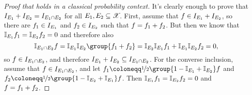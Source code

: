 \documentclass[preprint]{isipta2025}
\begin{document}
\begin{proof}[Proof that  holds in a classical probability context]
It's clearly enough to prove that \(\indifset[{\event[1]}]+\indifset[{\event[2]}]=\indifset[{\event[1]\cap\event[2]}]\) for all \(\event[1],\event[2]\subseteq\states\).
First, assume that \(\gbl\in\indifset[{\event[1]}]+\indifset[{\event[2]}]\), so there are \(\gbl_1\in\indifset[{\event[1]}]\) and \(\gbl_2\in\indifset[{\event[2]}]\) such that \(\gbl=\gbl_1+\gbl_2\).
But then we know that \(\indevent[1]\gbl_1=\indevent[2]\gbl_2=0\) and therefore also
\begin{equation*}
\indof{\event[1]\cap\event[2]}\gbl
=\indevent[1]\indevent[2]\group{\gbl_1+\gbl_2}
=\indevent[2]\indevent[1]\gbl_1+\indevent[1]\indevent[2]\gbl_2
=0,
\end{equation*}
so \(f\in\indifset[{\event[1]\cap\event[2]}]\), and therefore \(\indifset[{\event[1]}]+\indifset[{\event[2]}]\subseteq\indifset[{\event[1]\cap\event[2]}]\).
For the converse inclusion, assume that \(f\in\indifset[{\event[1]\cap\event[2]}]\), and let \(\gbl_1\coloneqq\nicefrac12\group{1-\indevent[1]+\indevent[2]}\gbl\) and \(\gbl_2\coloneqq\nicefrac12\group{1-\indevent[2]+\indevent[1]}\gbl\).
Then \(\indevent[1]\gbl_1=\indevent[2]\gbl_2=0\) and \(f=\gbl_1+\gbl_2\).
\end{proof}
\end{document}
